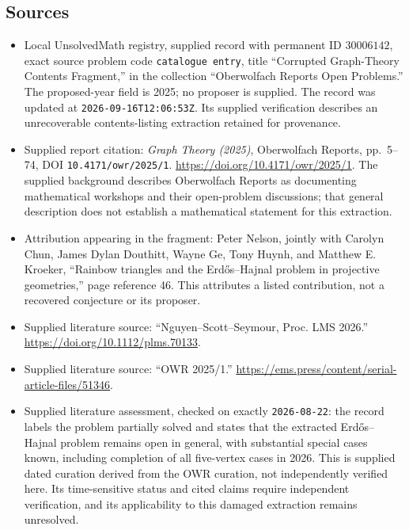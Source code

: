 \documentclass[11pt]{article}
\begin{document}
\subsection{Sources}
\begin{itemize}
\item Local UnsolvedMath registry, supplied record with permanent ID \(30006142\), exact source problem code \texttt{catalogue entry}, title ``Corrupted Graph-Theory Contents Fragment,'' in the collection ``Oberwolfach Reports Open Problems.'' The proposed-year field is 2025; no proposer is supplied. The record was updated at \texttt{2026-09-16T12:06:53Z}. Its supplied verification describes an unrecoverable contents-listing extraction retained for provenance.
\item Supplied report citation: \emph{Graph Theory (2025)}, Oberwolfach Reports, pp.~5--74, DOI \texttt{10.4171/owr/2025/1}. \url{https://doi.org/10.4171/owr/2025/1}. The supplied background describes Oberwolfach Reports as documenting mathematical workshops and their open-problem discussions; that general description does not establish a mathematical statement for this extraction.
\item Attribution appearing in the fragment: Peter Nelson, jointly with Carolyn Chun, James Dylan Douthitt, Wayne Ge, Tony Huynh, and Matthew E. Kroeker, ``Rainbow triangles and the Erdős--Hajnal problem in projective geometries,'' page reference 46. This attributes a listed contribution, not a recovered conjecture or its proposer.
\item Supplied literature source: ``Nguyen--Scott--Seymour, Proc. LMS 2026.'' \url{https://doi.org/10.1112/plms.70133}.
\item Supplied literature source: ``OWR 2025/1.'' \url{https://ems.press/content/serial-article-files/51346}.
\item Supplied literature assessment, checked on exactly \texttt{2026-08-22}: the record labels the problem partially solved and states that the extracted Erdős--Hajnal problem remains open in general, with substantial special cases known, including completion of all five-vertex cases in 2026. This is supplied dated curation derived from the OWR curation, not independently verified here. Its time-sensitive status and cited claims require independent verification, and its applicability to this damaged extraction remains unresolved.
\end{itemize}
\end{document}
